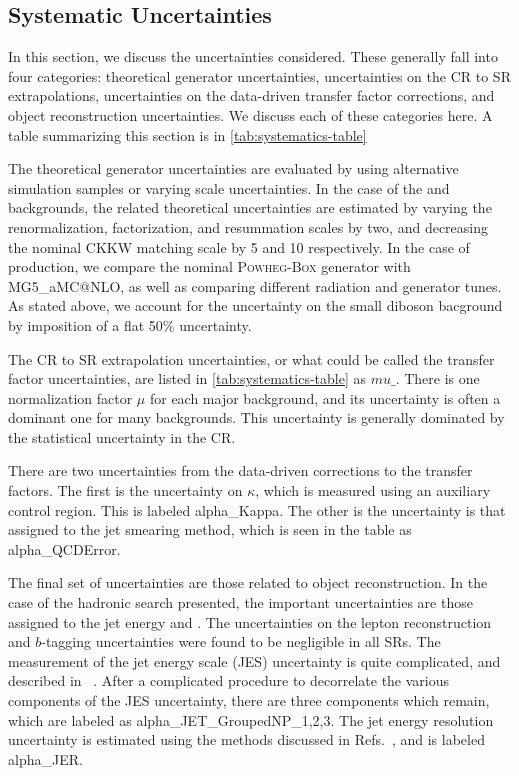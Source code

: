 \subsection{Systematic Uncertainties}

In this section, we discuss the uncertainties considered.
These generally fall into four categories: theoretical generator uncertainties, uncertainties on the CR to SR extrapolations, uncertainties on the data-driven transfer factor corrections, and object reconstruction uncertainties.
We discuss each of these categories here.
A table summarizing this section is in \ref{tab:systematics-table}


The theoretical generator uncertainties are evaluated by using alternative simulation samples or varying scale uncertainties.
In the case of the \zjets and \wjets backgrounds, the related theoretical uncertainties are estimated by varying the renormalization, factorization, and resummation scales by two, and decreasing the nominal CKKW matching scale by 5 \GeV and 10 \GeV respectively.
In the case of \ttbar production, we compare the nominal \textsc{Powheg-Box} generator with MG5\_aMC@NLO, as well as comparing different radiation and generator tunes.
As stated above, we account for the uncertainty on the small diboson bacground by imposition of a flat 50\% uncertainty.

The CR to SR extrapolation uncertainties, or what could be called the transfer factor uncertainties, are listed in \ref{tab:systematics-table} as $mu\_$.
There is one normalization factor $\mu$ for each major background, and its uncertainty is often a dominant one for many backgrounds.
This uncertainty is generally dominated by the statistical uncertainty in the CR.

There are two uncertainties from the data-driven corrections to the transfer factors.
The first is the uncertainty on $\kappa$, which is measured using an auxiliary \Zll control region.
This is labeled alpha\_Kappa.
The other is the uncertainty is that assigned to the jet smearing method, which is seen in the table as alpha\_QCDError.

The final set of uncertainties are those related to object reconstruction.
In the case of the hadronic search presented, the important uncertainties are those assigned to the jet energy and \met.
The uncertainties on the lepton reconstruction and $b$-tagging uncertainties were found to be negligible in all SRs.
The measurement of the jet energy scale (JES) uncertainty is quite complicated, and described in ~\cite{Aad:2011he,Aad:2012vm,ATL-PHYS-PUB-2015-015}.
After a complicated procedure to decorrelate the various components of the JES uncertainty, there are three components which remain, which are labeled as alpha\_JET\_GroupedNP\_1,2,3.
The jet energy resolution uncertainty is estimated using the methods discussed in Refs.~\cite{Aad:2012ag,ATL-PHYS-PUB-2015-015}, and is labeled alpha\_JER.

